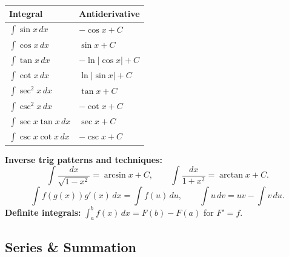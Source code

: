 \documentclass[11pt, letterpaper]{article}
\begin{document}
\noindent
{\small\renewcommand{\arraystretch}{1.7}
\begin{tabularx}{\textwidth}{>{\raggedright\arraybackslash}X >{\raggedright\arraybackslash}X}
\toprule\rowcolor{tableheaderpurple}\textbf{Integral}&\textbf{Antiderivative}\\\midrule
\rowcolor{rowPu} $\int\sin x\,dx$ & $-\cos x+C$\\
\rowcolor{rowA} $\int\cos x\,dx$ & $\sin x+C$\\
\rowcolor{rowPu} $\int\tan x\,dx$ & $-\ln|\cos x|+C$\\
\rowcolor{rowA} $\int\cot x\,dx$ & $\ln|\sin x|+C$\\
\rowcolor{rowPu} $\int\sec^2x\,dx$ & $\tan x+C$\\
\rowcolor{rowA} $\int\csc^2x\,dx$ & $-\cot x+C$\\
\rowcolor{rowPu} $\int\sec x\tan x\,dx$ & $\sec x+C$\\
\rowcolor{rowA} $\int\csc x\cot x\,dx$ & $-\csc x+C$\\
\bottomrule\end{tabularx}}

\textbf{Inverse trig patterns and techniques:}
\[
\int\frac{dx}{\sqrt{1-x^2}}=\arcsin x+C,\qquad
\int\frac{dx}{1+x^2}=\arctan x+C.
\]
\[
\int f(g(x))g'(x)\,dx=\int f(u)\,du,\qquad
\int u\,dv=uv-\int v\,du.
\]
\textbf{Definite integrals:} $\displaystyle\int_a^b f(x)\,dx=F(b)-F(a)$ for $F'=f$.

\subsection*{Series \& Summation}
\end{document}
